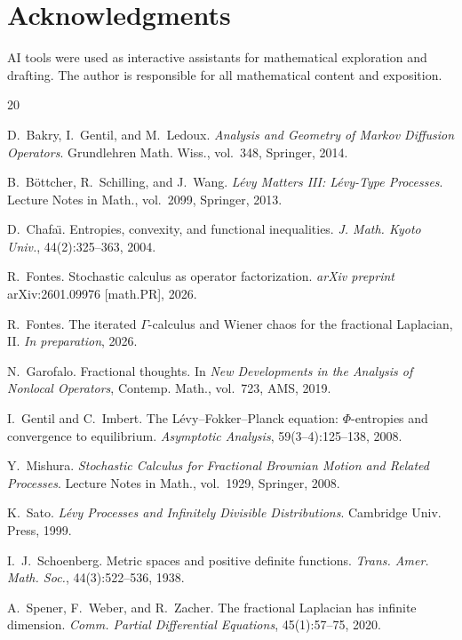\documentclass[11pt,a4paper]{article}
\theoremstyle{plain}
\theoremstyle{definition}
\theoremstyle{remark}
\begin{document}
\section*{Acknowledgments}
AI tools were used as interactive assistants for mathematical
exploration and drafting. The author
is responsible for all mathematical content and exposition.


\begin{thebibliography}{20}

D.~Bakry, I.~Gentil, and M.~Ledoux.
\newblock \emph{Analysis and Geometry of Markov Diffusion Operators}.
\newblock Grundlehren Math. Wiss., vol.~348, Springer, 2014.

B.~B\"ottcher, R.~Schilling, and J.~Wang.
\newblock \emph{L\'evy Matters III: L\'evy-Type Processes}.
\newblock Lecture Notes in Math., vol.~2099, Springer, 2013.

D.~Chafa\"{\i}.
\newblock Entropies, convexity, and functional inequalities.
\newblock \emph{J. Math. Kyoto Univ.}, 44(2):325--363, 2004.

R.~Fontes.
\newblock Stochastic calculus as operator factorization.
\newblock \emph{arXiv preprint} arXiv:2601.09976 [math.PR], 2026.

R.~Fontes.
\newblock The iterated $\Gamma$-calculus and Wiener chaos for the
  fractional Laplacian, II.
\newblock \emph{In preparation}, 2026.

N.~Garofalo.
\newblock Fractional thoughts.
\newblock In \emph{New Developments in the Analysis of Nonlocal Operators},
  Contemp. Math., vol.~723, AMS, 2019.

I.~Gentil and C.~Imbert.
\newblock The {L}\'evy--{F}okker--{P}lanck equation: $\Phi$-entropies
  and convergence to equilibrium.
\newblock \emph{Asymptotic Analysis}, 59(3--4):125--138, 2008.

Y.~Mishura.
\newblock \emph{Stochastic Calculus for Fractional Brownian Motion
  and Related Processes}.
\newblock Lecture Notes in Math., vol.~1929, Springer, 2008.

K.~Sato.
\newblock \emph{L\'evy Processes and Infinitely Divisible Distributions}.
\newblock Cambridge Univ. Press, 1999.

I.~J.~Schoenberg.
\newblock Metric spaces and positive definite functions.
\newblock \emph{Trans. Amer. Math. Soc.}, 44(3):522--536, 1938.

A.~Spener, F.~Weber, and R.~Zacher.
\newblock The fractional {L}aplacian has infinite dimension.
\newblock \emph{Comm. Partial Differential Equations}, 45(1):57--75, 2020.

\end{thebibliography}
\end{document}

